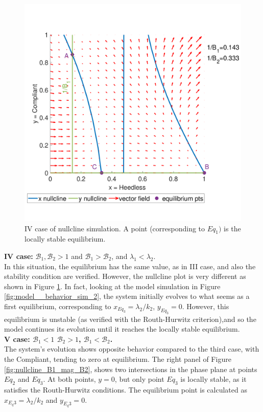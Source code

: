 \begin{figure}[ht]
	\centering
	\includegraphics[width=0.48\linewidth]{1_corpo/figure/behavioural_equilibrium/Pr_nullcline_B1_mag_B2_lambda2_mag}
	\caption[Nullcline fourth case]{IV case of nullcline simulation. A point (corresponding to $Eq_1)$ is the locally stable equilibrium.}
	\label{fig:prnullclineb1_mag_b2_lambda}
\end{figure}

\noindent\textbf{IV case: } $\mathcal{B}_1, \mathcal{B}_2 >1$ and $\mathcal{B}_1 >  \mathcal{B}_2$, and $\lambda_1 < \lambda_2$. \\
\label{par:behav_4_case}
In this situation, the equilibrium has the same value, as in III case, and also the stability condition are verified. However, the nullcline plot is very different as shown in Figure \ref{fig:prnullclineb1_mag_b2_lambda}. 
In fact, looking at the model simulation in Figure \ref{fig:model__behavior_sim_2}, the system initially evolves to what seems as a first equilibrium, corresponding to $x_{Eq_3} = \lambda_2/k_2$, $y_{Eq_3} = 0$. However, this equilibrium is unstable (as verified with the Routh-Hurwitz criterion),and so the model continues its evolution until it reaches the locally stable equilibrium.\\ 


\noindent\textbf{V case: $\mathcal{B}_1 < 1$ $\mathcal{B}_2 >1$, $\mathcal{B}_1 <  \mathcal{B}_2$.}\\
The system's evolution shows opposite behavior compared to the third case, with the Compliant, tending to zero at equilibrium. The right panel of Figure \ref{fig:nullcline_B1_mag_B2}, shows two intersections in the phase plane at points $Eq_2$ and $Eq_3$. At both points, $y=0$, but only point $Eq_3$ is locally stable, as it satisfies the Routh-Hurwitz conditions. The equilibrium point is calculated as $x_{E_q3}= \lambda_2/k_2$ and $y_{E_q3} = 0$. 


